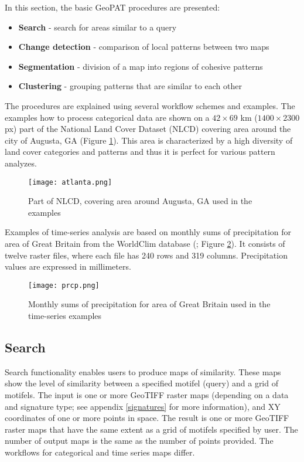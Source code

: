 In this section, the basic GeoPAT procedures are presented: 

\begin{itemize}
	\item {\bf Search} - search for areas similar to a query
	\item {\bf Change detection} - comparison of local patterns between two maps
	\item {\bf Segmentation} - division of a map into regions of cohesive patterns
	\item {\bf Clustering} - grouping patterns that are similar to each other
\end{itemize}

The procedures are explained using several workflow schemes and examples.
The examples how to process categorical data are shown on a $42\times 69$ km ($1400\times 2300$ px) part of the National Land Cover Dataset (NLCD) covering area around the city of Augusta, GA (Figure \ref{FIG:AUGUSTA}).
This area is characterized by a high diversity of land cover categories and patterns and thus it is perfect for various pattern analyzes.

\begin{figure}[H]
	\centering
	\texttt{[image: atlanta.png]}
	\caption{Part of NLCD, covering area around Augusta, GA used in the examples}
	\label{FIG:AUGUSTA}
\end{figure}

Examples of time-series analysis are based on monthly sums of precipitation for area of Great Britain from the WorldClim database (\cite{hijmans2005very}; Figure \ref{FIG:PRCP}).
It consists of twelve raster files, where each file has 240 rows and 319 columns.
Precipitation values are expressed in millimeters.

\begin{figure}[H]
	\centering
	\texttt{[image: prcp.png]}
	\caption{Monthly sums of precipitation for area of Great Britain used in the time-series examples}
	\label{FIG:PRCP}
\end{figure}

\FloatBarrier

\subsection{Search}

Search functionality enables users to produce maps of similarity. 
These maps show the level of similarity between a specified motifel (query) and a grid of motifels.
The input is one or more GeoTIFF raster maps (depending on a data and signature type; see appendix \ref{signatures} for more information), and XY coordinates of one or more points in space.
The result is one or more GeoTIFF raster maps that have the same extent as a grid of motifels specified by user.
The number of output maps is the same as the number of points provided.
The workflows for categorical and time series maps differ.

